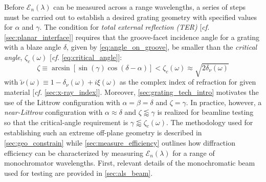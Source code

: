 Before $\mathscr{E}_n \! \left( \lambda \right)$ can be measured across a range wavelengths, a series of steps must be carried out to establish a desired grating geometry with specified values for $\alpha$ and $\gamma$. 
The condition for \emph{total external reflection (TER)} [\emph{cf.\@} \cref{sec:planar_interface}] requires that the groove-facet incidence angle for a grating with a blaze angle $\delta$, given by \cref{eq:angle_on_groove}, be smaller than the \emph{critical angle}, $\zeta_c (\omega)$ [\emph{cf.\@} \cref{eq:critical_angle}]: 
\begin{equation}\label{eq:TER_condition_grat}
 \zeta \equiv \arcsin \left[ \sin \left( \gamma \right) \cos \left( \delta - \alpha \right) \right] < \zeta_c (\omega) \approx \sqrt{2 \delta_{\nu} (\omega)} 
 \end{equation} 
with $\tilde{\nu}(\omega) \equiv 1 - \delta_{\nu} (\omega) + i \xi(\omega)$ as the complex index of refraction for given material [\emph{cf.\@} \cref{sec:x-ray_index}]. 
Moreover, \cref{sec:grating_tech_intro} motivates the use of the Littrow configuration with $\alpha = \beta = \delta$ and $\zeta = \gamma$. 
In practice, however, a \emph{near-Littrow} configuration with $\alpha \approx \delta$ and $\zeta \lessapprox \gamma$ is realized for beamline testing so that the critical-angle requirement is $\gamma \lessapprox \zeta_c (\omega)$. 
The methodology used for establishing such an extreme off-plane geometry is described in \cref{sec:geo_constrain} while \cref{sec:measure_efficiency} outlines how diffraction efficiency can be characterized by measuring $\mathscr{E}_n \! \left( \lambda \right)$ for a range of monochromator wavelengths. 
First, relevant details of the monochromatic beam used for testing are provided in \cref{sec:als_beam}. 

